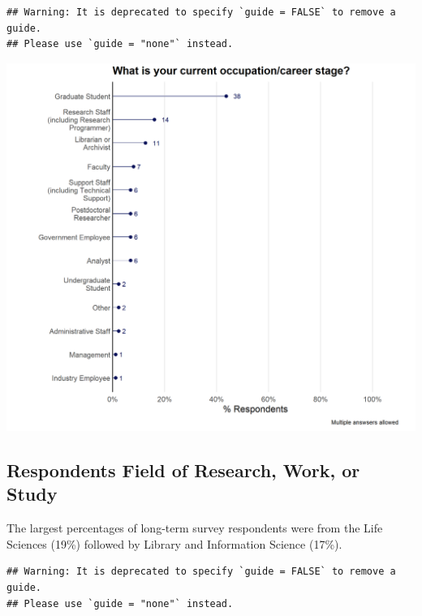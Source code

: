 \documentclass[
]{article}
\makeatletter
\def\maxwidth{\ifdim\Gin@nat@width>\linewidth\linewidth\else\Gin@nat@width\fi}
\makeatother
\begin{document}
\begin{verbatim}
## Warning: It is deprecated to specify `guide = FALSE` to remove a guide.
## Please use `guide = "none"` instead.
\end{verbatim}

\includegraphics[width=\maxwidth]{../figures/2020-12-longterm-occupation-1}

\hypertarget{respondents-field-of-research-work-or-study}{%
\subsection{Respondents Field of Research, Work, or
Study}\label{respondents-field-of-research-work-or-study}}

The largest percentages of long-term survey respondents were from the
Life Sciences (19\%) followed by Library and Information Science (17\%).

\begin{verbatim}
## Warning: It is deprecated to specify `guide = FALSE` to remove a guide.
## Please use `guide = "none"` instead.
\end{verbatim}
\end{document}
